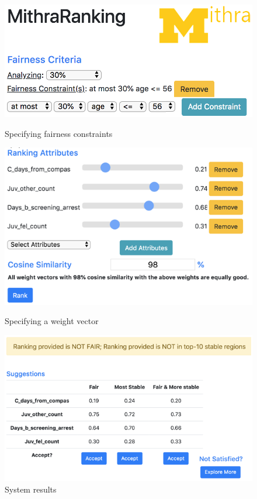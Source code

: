 \begin{figure}[!tb]
\begin{minipage}[t]{0.32\textwidth}
\centering
    \vspace{-35mm}
    \includegraphics[width=\textwidth]{figs/m2.png}
    \vspace{2mm}\caption{Specifying fairness constraints}
    \label{fig:MR1}
\end{minipage}
\hfill
\begin{minipage}[t]{0.32\textwidth}
\centering
    \includegraphics[width=\textwidth]{figs/m3.png}
    \vspace{-8mm}\caption{Specifying a weight vector}
    \label{fig:MR2}
\end{minipage}
\hfill
\begin{minipage}[t]{0.32\textwidth}
\centering
    \includegraphics[width=\textwidth]{figs/m5.png}
    \vspace{-8mm}\caption{System results}
    \label{fig:MR3}
\end{minipage}
\end{figure}


